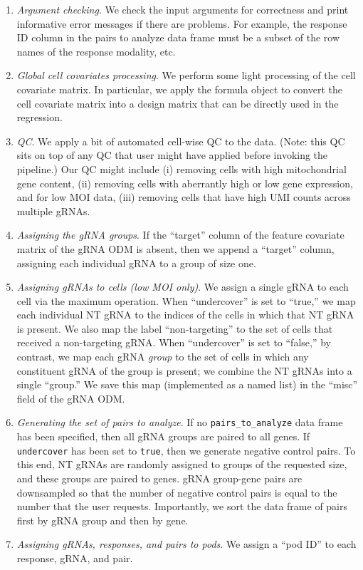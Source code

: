 \documentclass[12pt]{article}
\begin{document}
\begin{enumerate}
\item \textit{Argument checking}. We check the input arguments for correctness and print informative error messages if there are problems. For example, the  response ID column in the pairs to analyze data frame must be a subset of the row names of the response modality, etc.

\item \textit{Global cell covariates processing}. We perform some light processing of the cell covariate matrix. In particular, we apply the formula object to convert the cell covariate matrix into a design matrix that can be directly used in the regression.

\item \textit{QC}. We apply a bit of automated cell-wise QC to the data. (Note: this QC sits on top of any QC that user might have applied before invoking the pipeline.) Our QC might include (i) removing cells with high mitochondrial gene content, (ii) removing cells with aberrantly high or low gene expression, and for low MOI data, (iii) removing cells that have high UMI counts across multiple gRNAs.

\item \textit{Assigning the gRNA groups}. If the ``target'' column of the feature covariate matrix of the gRNA ODM is absent, then we append a ``target'' column, assigning each individual gRNA to a group of size one.

\item\textit{Assigning gRNAs to cells (low MOI only)}. We assign a single gRNA to each cell via the maximum operation. When ``undercover'' is set to ``true,'' we map each individual NT gRNA to the indices of the cells in which that NT gRNA is present. We also map the label ``non-targeting'' to the set of cells that received a non-targeting gRNA. When ``undercover'' is set to ``false,'' by contrast, we map each gRNA \textit{group} to the set of cells in which any constituent gRNA of the group is present; we combine the NT gRNAs into a single ``group.'' We save this map (implemented as a named list) in the ``misc'' field of the gRNA ODM.

\item \textit{Generating the set of pairs to analyze}. If no \texttt{pairs\_to\_analyze} data frame has been specified, then all gRNA groups are paired to all genes. If \texttt{undercover} has been set to \texttt{true}, then we generate negative control pairs. To this end, NT gRNAs are randomly assigned to groups of the requested size, and these groups are paired to genes. gRNA group-gene pairs are downsampled so that the number of negative control pairs is equal to the number that the user requests. Importantly, we sort the data frame of pairs first by gRNA group and then by gene.

\item \textit{Assigning gRNAs, responses, and pairs to pods}. We assign a “pod ID” to each response, gRNA, and pair.

\end{enumerate}
\end{document}
